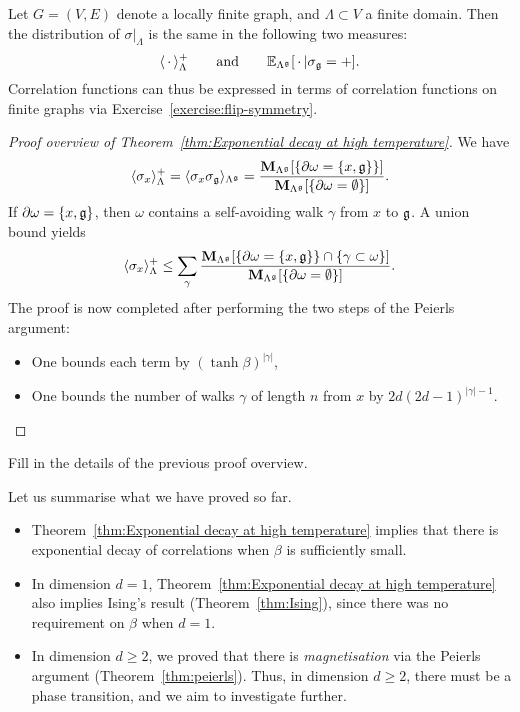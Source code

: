 \begin{lemma}
    \label{lemma:ghost}
    Let $G=(V,E)$ denote a locally finite graph,
    and $\Lambda\subset V$ a finite domain.
    Then the distribution of $\sigma|_{\Lambda}$ is the same in the following
    two measures:
    \[
        \langle\blank\rangle_{\Lambda}^+
        \qquad\text{and}\qquad
        \E_{\Lambda^\frakg}[\blank|\sigma_\frakg=+].
    \]
    Correlation functions can thus be expressed in terms of correlation functions
    on finite graphs via Exercise~\ref{exercise:flip-symmetry}.
\end{lemma}

\begin{proof}[Proof overview of Theorem~\ref{thm:Exponential decay at high temperature}]
    We have
    \[
        \langle\sigma_x\rangle_{\Lambda}^+
        =
        \langle\sigma_x\sigma_\mathfrak g\rangle_{\Lambda^\mathfrak g}
        =
        \frac{
        \mathbf{M}_{\Lambda^\mathfrak g}[\{\partial\omega=\{x,\mathfrak g\}\}]
        }{
        \mathbf{M}_{\Lambda^\mathfrak g}[\{\partial\omega=\emptyset\}]
        }.
    \]
    If $\partial\omega=\{x,\mathfrak g\}$, then $\omega$ contains a self-avoiding
    walk $\gamma$ from $x$ to $\mathfrak g$.
    A union bound yields
    \[
        \langle\sigma_x\rangle_{\Lambda}^+
        \leq
        \sum_{\gamma}\frac{\mathbf{M}_{\Lambda^\mathfrak g}[\{\partial\omega=\{x,\mathfrak g\}\}\cap\{\gamma\subset\omega\}]}{\mathbf{M}_{\Lambda^\mathfrak g}[\{\partial\omega=\emptyset\}]}.
    \]
    The proof is now completed after performing the two steps of the Peierls argument:
    \begin{itemize}
        \item One bounds each term by $(\tanh\beta)^{|\gamma|}$,
        \item One bounds the number of walks $\gamma$ of length $n$ from $x$ by $2d(2d-1)^{|\gamma|-1}$.
    \end{itemize} 
    \qedhere
\end{proof}

\begin{exercise}
    Fill in the details of the previous proof overview.
\end{exercise}

Let us summarise what we have proved so far.
\begin{itemize}
    \item Theorem~\ref{thm:Exponential decay at high temperature}
    implies that there is exponential decay of correlations when $\beta$ is sufficiently small.
    \item In dimension $d=1$, Theorem~\ref{thm:Exponential decay at high temperature} also implies Ising's result (Theorem~\ref{thm:Ising}),
    since there was no requirement on $\beta$ when $d=1$.
    \item In dimension $d\geq 2$, we proved that there is \emph{magnetisation} via the
    Peierls argument (Theorem~\ref{thm:peierls}).
    Thus, in dimension $d\geq 2$, there must be a phase transition,
    and we aim to investigate further.
\end{itemize}

